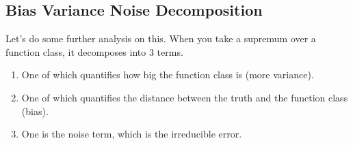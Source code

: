 \subsection{Bias Variance Noise Decomposition} 

  Let's do some further analysis on this. When you take a supremum over a function class, it decomposes into 3 terms. 
  \begin{enumerate}
    \item One of which quantifies how big the function class is (more variance). 
    \item One of which quantifies the distance between the truth and the function class (bias).  
    \item One is the noise term, which is the irreducible error. 
  \end{enumerate}

